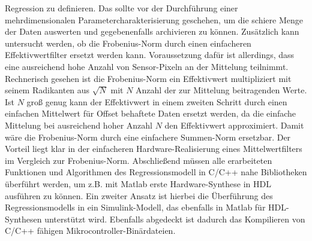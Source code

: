 Regression zu definieren. Das sollte vor der Durchführung einer mehrdimensionalen Parametercharakterisierung geschehen, um die schiere Menge der Daten auswerten und gegebenenfalls archivieren zu können. Zusätzlich kann untersucht werden, ob die Frobenius-Norm durch einen einfacheren Effektivwertfilter ersetzt werden kann. Voraussetzung dafür ist allerdings, dass eine ausreichend hohe Anzahl von Sensor-Pixeln an der Mittelung teilnimmt. Rechnerisch gesehen ist die Frobenius-Norm ein Effektivwert multipliziert mit seinem Radikanten aus $\sqrt{N}$ mit $N$ Anzahl der zur Mittelung beitragenden Werte. Ist $N$ groß genug kann der Effektivwert in einem zweiten Schritt durch einen einfachen Mittelwert für Offset behaftete Daten ersetzt werden, da die einfache Mittelung bei ausreichend hoher Anzahl $N$ den Effektivwert approximiert. Damit wäre die Frobenius-Norm durch eine einfachere Summen-Norm ersetzbar. Der Vorteil liegt klar in der einfacheren Hardware-Realisierung eines Mittelwertfilters im Vergleich zur Frobenius-Norm. Abschließend müssen alle erarbeiteten Funktionen und Algorithmen des Regressionsmodell in C/C++ nahe Bibliotheken überführt werden, um z.B. mit Matlab erste Hardware-Synthese in HDL ausführen zu können. Ein zweiter Ansatz ist hierbei die Überführung des Regressionsmodells in ein Simulink-Modell, das ebenfalls in Matlab für HDL-Synthesen unterstützt wird. Ebenfalls abgedeckt ist dadurch das Kompilieren von C/C++ fähigen Mikrocontroller-Binärdateien.

